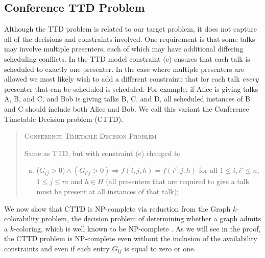 \documentclass{svjour3}                     %
\begin{document}
\subsection{Conference TTD Problem}
Although the TTD problem is related to our target problem, it does not capture all of the decisions and constraints involved.
One requirement is that some talks may involve multiple presenters, each of which may have additional differing scheduling conflicts.
In the TTD model constraint (c) ensures that each talk is scheduled to exactly one presenter. 
In the case where multiple presenters are allowed we most likely wish to add a different constraint: that for each talk \emph{every} presenter that can be scheduled is scheduled. 
For example, if Alice is giving talks A, B, and C, and Bob is giving talks B, C, and D, all scheduled instances of B and C should include both Alice and Bob. 
We call this variant the Conference Timetable Decision problem (CTTD).
\begin{quote}
	\textsc{Conference Timetable Decision Problem}
	
	Same as TTD, but with constraint (c) changed to
	\begin{enumerate}[(c)]
		\item ($G_{ij} > 0) \land (G_{i'j} > 0) \Rightarrow f(i,j,h)=f(i',j,h)$ for all $1 \le i,i' \le n$, $1 \le j \le m$ and $h \in H$ (all presenters that are required to give a talk must be present at all instances of that talk);
	\end{enumerate}
\end{quote}

We now show that CTTD is NP-complete via reduction from the Graph $k$-colorability problem, the decision problem of determining whether a graph admits a $k$-coloring, which is well known to be NP-complete \cite{garey76_2}.
As we will see in the proof, the CTTD problem is NP-complete even without the inclusion of the availability constraints and even if each entry $G_{ij}$ is equal to zero or one.
\end{document}
